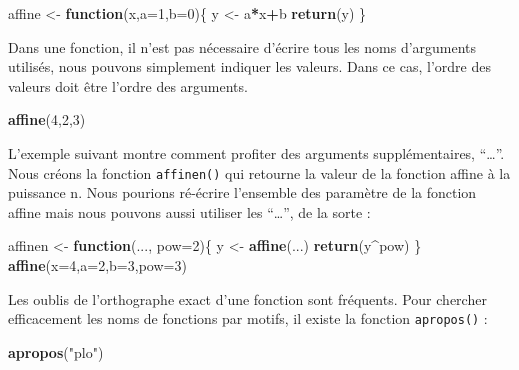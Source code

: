 \documentclass[]{article}
\newenvironment{Shaded}{\begin{snugshade}}{\end{snugshade}}
\newcommand{\ControlFlowTok}[1]{\textcolor[rgb]{0.13,0.29,0.53}{\textbf{#1}}}
\newcommand{\DataTypeTok}[1]{\textcolor[rgb]{0.13,0.29,0.53}{#1}}
\newcommand{\DecValTok}[1]{\textcolor[rgb]{0.00,0.00,0.81}{#1}}
\newcommand{\KeywordTok}[1]{\textcolor[rgb]{0.13,0.29,0.53}{\textbf{#1}}}
\newcommand{\NormalTok}[1]{#1}
\newcommand{\OperatorTok}[1]{\textcolor[rgb]{0.81,0.36,0.00}{\textbf{#1}}}
\newcommand{\StringTok}[1]{\textcolor[rgb]{0.31,0.60,0.02}{#1}}
\begin{document}
\begin{Shaded}
\begin{Highlighting}[]
\NormalTok{  affine <-}\StringTok{ }\ControlFlowTok{function}\NormalTok{(x,}\DataTypeTok{a=}\DecValTok{1}\NormalTok{,}\DataTypeTok{b=}\DecValTok{0}\NormalTok{)\{}
\NormalTok{    y <-}\StringTok{ }\NormalTok{a}\OperatorTok{*}\NormalTok{x}\OperatorTok{+}\NormalTok{b}
    \KeywordTok{return}\NormalTok{(y)}
\NormalTok{  \}}
\end{Highlighting}
\end{Shaded}

Dans une fonction, il n'est pas nécessaire d'écrire tous les noms d'arguments utilisés, nous pouvons simplement indiquer les valeurs. Dans ce cas, l'ordre des valeurs doit être l'ordre des arguments.

\begin{Shaded}
\begin{Highlighting}[]
\KeywordTok{affine}\NormalTok{(}\DecValTok{4}\NormalTok{,}\DecValTok{2}\NormalTok{,}\DecValTok{3}\NormalTok{)}
\end{Highlighting}
\end{Shaded}

L'exemple suivant montre comment profiter des arguments supplémentaires, ``\ldots{}''. Nous créons la fonction \texttt{affinen()} qui retourne la valeur de la fonction affine à la puissance n. Nous pourions ré-écrire l'ensemble des paramètre de la fonction affine mais nous pouvons aussi utiliser les ``\ldots{}'', de la sorte :

\begin{Shaded}
\begin{Highlighting}[]
\NormalTok{  affinen <-}\StringTok{ }\ControlFlowTok{function}\NormalTok{(..., }\DataTypeTok{pow=}\DecValTok{2}\NormalTok{)\{}
\NormalTok{    y <-}\StringTok{ }\KeywordTok{affine}\NormalTok{(...)}
    \KeywordTok{return}\NormalTok{(y}\OperatorTok{^}\NormalTok{pow)}
\NormalTok{  \}}
  \KeywordTok{affine}\NormalTok{(}\DataTypeTok{x=}\DecValTok{4}\NormalTok{,}\DataTypeTok{a=}\DecValTok{2}\NormalTok{,}\DataTypeTok{b=}\DecValTok{3}\NormalTok{,}\DataTypeTok{pow=}\DecValTok{3}\NormalTok{)}
\end{Highlighting}
\end{Shaded}

Les oublis de l'orthographe exact d'une fonction sont fréquents. Pour chercher efficacement les noms de fonctions par motifs, il existe la fonction \texttt{apropos()} :

\begin{Shaded}
\begin{Highlighting}[]
\KeywordTok{apropos}\NormalTok{(}\StringTok{"plo"}\NormalTok{)}
\end{Highlighting}
\end{Shaded}
\end{document}
